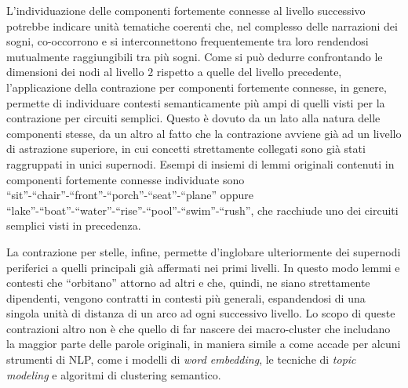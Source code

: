 L'individuazione delle componenti fortemente connesse al livello successivo potrebbe indicare unità tematiche coerenti
che, nel complesso delle narrazioni dei sogni, co-occorrono e si interconnettono frequentemente tra loro rendendosi
mutualmente raggiungibili tra più sogni.
Come si può dedurre confrontando le dimensioni dei nodi al livello $2$ rispetto a quelle del livello precedente,
l'applicazione della contrazione per componenti fortemente connesse, in genere, permette di individuare contesti
semanticamente più ampi di quelli visti per la contrazione per circuiti semplici.
Questo è dovuto da un lato alla natura delle componenti stesse, da un altro al fatto che la contrazione avviene
già ad un livello di astrazione superiore, in cui concetti strettamente collegati sono già stati raggruppati in unici
supernodi.
Esempi di insiemi di lemmi originali contenuti in componenti fortemente connesse individuate sono
``sit''-``chair''-``front''-``porch''-``seat''-``plane''
oppure ``lake''-``boat''-``water''-``rise''-``pool''-``swim''-``rush'', che racchiude uno dei circuiti semplici visti
in precedenza.

La contrazione per stelle, infine, permette d'inglobare ulteriormente dei supernodi periferici a quelli principali già
affermati nei primi livelli.
In questo modo lemmi e contesti che ``orbitano'' attorno ad altri e che, quindi,
ne siano strettamente dipendenti, vengono contratti in contesti più generali, espandendosi di una singola unità
di distanza di un arco ad ogni successivo livello.
Lo scopo di queste contrazioni altro non è che quello di far nascere dei macro-cluster che includano la maggior parte
delle parole originali, in maniera simile a come accade per alcuni strumenti di NLP, come i modelli di
\textit{word embedding}, le tecniche di \textit{topic modeling} e algoritmi di clustering semantico.